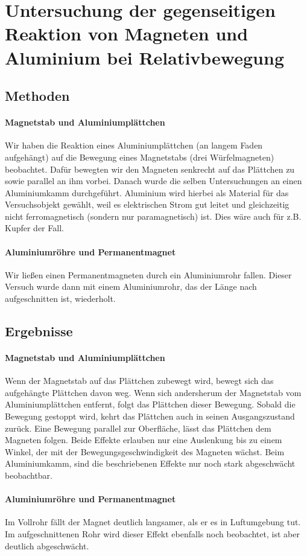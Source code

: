 \documentclass[
	a4paper,
	12pt,
	pagesize,
	ngerman
]{scrartcl}
\begin{document}
	\section{Untersuchung der gegenseitigen Reaktion von Magneten und Aluminium bei Relativbewegung}
	\subsection{Methoden}
	\paragraph{Magnetstab und Aluminiumplättchen}
	Wir haben die Reaktion eines Aluminiumplättchen (an langem Faden aufgehängt) auf die Bewegung eines Magnetstabs (drei Würfelmagneten) beobachtet. Dafür bewegten wir den Magneten senkrecht auf das Plättchen zu sowie parallel an ihm vorbei.
	Danach wurde die selben Untersuchungen an einen Aluminiumkamm durchgeführt. Aluminium wird hierbei als Material für das Versuchsobjekt gewählt, weil es elektrischen Strom gut leitet und gleichzeitig nicht ferromagnetisch (sondern nur paramagnetisch) ist. Dies wäre auch für z.B. Kupfer der Fall. 
	\paragraph{Aluminiumröhre und Permanentmagnet}
	Wir ließen einen Permanentmagneten durch ein Aluminiumrohr fallen. Dieser Versuch wurde dann mit einem Aluminiumrohr, das der Länge nach aufgeschnitten ist, wiederholt.
	\subsection{Ergebnisse}
	\paragraph{Magnetstab und Aluminiumplättchen}
	Wenn der Magnetstab auf das Plättchen zubewegt wird, bewegt sich das aufgehängte Plättchen davon weg. Wenn sich andersherum der Magnetstab vom Aluminiumplättchen entfernt, folgt das Plättchen dieser Bewegung. Sobald die Bewegung gestoppt wird, kehrt das Plättchen auch in seinen Ausgangszustand zurück. Eine Bewegung parallel zur Oberfläche, lässt das Plättchen dem Magneten folgen. Beide Effekte erlauben nur eine Auslenkung bis zu einem Winkel, der mit der Bewegungsgeschwindigkeit des Magneten wächst. %
	Beim Aluminiumkamm, sind die beschriebenen Effekte nur noch stark abgeschwächt beobachtbar.
	\paragraph{Aluminiumröhre und Permanentmagnet}
	Im Vollrohr fällt der Magnet deutlich langsamer, als er es in Luftumgebung tut. Im aufgeschnittenen Rohr wird dieser Effekt ebenfalls noch beobachtet, ist aber deutlich abgeschwächt.
\end{document}
